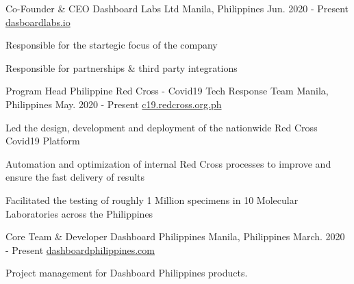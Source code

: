 
\begin{cventries}
  \cventry
    {Co-Founder \& CEO} %
    {Dashboard Labs Ltd} %
    {Manila, Philippines} %
    {Jun. 2020 - Present} %
    {\href{https://dashboardlabs.io}{dasboardlabs.io}} %
    {
      \begin{cvitems} %
      \item {Responsible for the startegic focus of the company}
      \item {Responsible for partnerships & third party integrations}
      \end{cvitems}
    }
  \cventry
    {Program Head } %
    {Philippine Red Cross - Covid19 Tech Response Team} %
    {Manila, Philippines} %
    {May. 2020 - Present} %
    {\href{https://c19.redcross.org.ph}{c19.redcross.org.ph}} %
    {
      \begin{cvitems} %
      \item {Led the design, development and deployment of the nationwide Red Cross Covid19 Platform}
      \item {Automation and optimization of internal Red Cross processes to improve and ensure the fast delivery of results}
      \item {Facilitated the testing of roughly 1 Million specimens in 10 Molecular Laboratories across the Philippines}
      \end{cvitems}
    }
  \cventry
    {Core Team \& Developer} %
    {Dashboard Philippines} %
    {Manila, Philippines} %
    {March. 2020 - Present} %
    {\href{https://dashboardphilippines.com}{dashboardphilippines.com}} %
    {
      \begin{cvitems} %
      \item {Project management for Dashboard Philippines products.}

\end{cvitems}}
\end{cventries}
